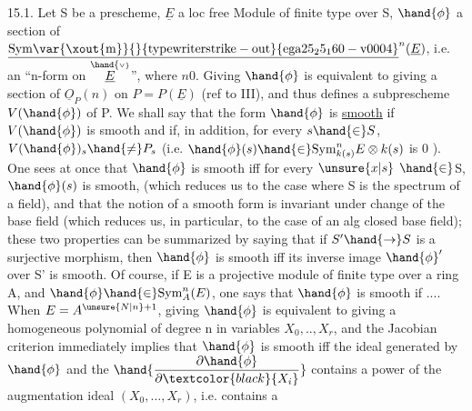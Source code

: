 15.1. Let S be a prescheme, $\underline{E}$ a loc free Module of finite type
over S, $\hand{\phi}$ a section of $\underline{\mathrm{Sym\var{\xout{m}}{}{typewriter strike-out}{ega25_25_160-v0004}}}^n(\underline{E})$, i.e. an ``n-form on $\overset{\hand{\scriptscriptstyle\vee}}{\underline{E}}$'', where $n$$0$.
Giving $\hand{\phi}$ is equivalent to giving a section of $\underline{O}_P(n)$ on $P=P(\underline{E})$
(ref to III), and thus defines a subprescheme $V(\hand{\phi})$ of P. We shall say that
the form $\hand{\phi}$ is \uline{smooth} if $V(\hand{\phi})$ is smooth and if, in addition, for every $s\hand{\in} S$,
$V(\hand{\phi})_s\hand{\neq} P_s$ (i.e. $\hand{\phi}(s)\hand{\in} \mathrm{Sym}^n_{k(s)}E\otimes k(s)$ is \hand{\unsure{(}}$0$ ). One sees at once
that $\hand{\phi}$ is smooth iff for every $\unsure{x|s}$ $\hand{\in}$S, $\hand{\phi}(s)$ is smooth, 
(which reduces us to the case where S is the spectrum of a field), and
that the notion of a smooth form is invariant under change of the base
field (which reduces us, in particular, to the case of an alg
closed base field); these two properties can be summarized by saying that if $S'\hand{\to} S$ is
a surjective morphism, then $\hand{\phi}$ is smooth iff its inverse image $\hand{\phi}'$ over S'
is smooth. Of course, if E is a projective module of finite type over a
ring A, and $\hand{\phi}\hand{\in}\mathrm{Sym}^n_A(E)$, one says that $\hand{\phi}$ is smooth if .... When $E=A^{\unsure{N|n}+1}$,
giving $\hand{\phi}$ is equivalent to giving a  homogeneous polynomial of degree n
in variables $X_0,..,X_r$, and the Jacobian criterion immediately implies
that  $\hand{\phi}$ is smooth iff the ideal generated by $\hand{\phi}$ and the $\hand{\dfrac{\partial\hand{\phi}}{\partial\textcolor{black}{X_i}}}$ contains
a power of the augmentation ideal $(X_0,\dots,X_r)$, i.e. contains a

 
